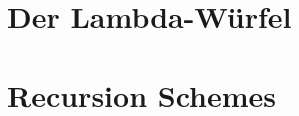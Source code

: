 \documentclass{beamer}
\begin{document}
\section*{Der Lambda-Würfel}

\section*{Recursion Schemes}

\end{document}
